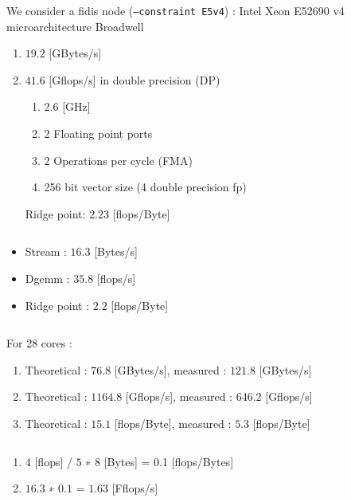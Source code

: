 \documentclass[11pt,a4paper]{article}
\begin{document}

\noindent

\begin{exercise}
  $~$ %

We consider a fidis node (\texttt{--constraint E5v4}) : Intel Xeon E52690 v4 microarchitecture Broadwell

\begin{enumerate}
\item $19.2$ [GBytes/s]
\item {$41.6$ [Gflops/s] in double precision (DP)
	\begin{enumerate}[label=(\alph*)]
		\item 2.6 [GHz]	
		\item 2 Floating point ports
		\item 2 Operations per cycle (FMA)
		\item 256 bit vector size (4 double precision fp)
	\end{enumerate}
Ridge point: $2.23 $ [flops/Byte]
}
\end{enumerate}
\end{exercise}


\begin{exercise}
  $~$ %

\begin{itemize}
\item Stream : $16.3$ [Bytes/s]
\item Dgemm : $35.8$ [flops/s]
\item Ridge point : $2.2$ [flops/Byte]
\end{itemize}

\end{exercise}

\begin{exercise}
  $~$ %

For 28 cores : 

\begin{enumerate}
\item Theoretical : $76.8$ [GBytes/s], measured : $121.8$ [GBytes/s]
\item Theoretical : $1164.8$ [Gflops/s], measured : $646.2$ [Gflops/s]
\item Theoretical : $15.1$ [flops/Byte], measured : $5.3$ [flops/Byte]
\end{enumerate}

\end{exercise}


\begin{exercise}
  $~$ %

\begin{enumerate}
\item $4$ [flops] / $5$ ∗ 8 [Bytes] = 0.1 [flops/Bytes]
\item $16.3$ ∗ $0.1$ = $1.63$ [Fflops/s]
\end{enumerate}

\end{exercise}
\end{document}
